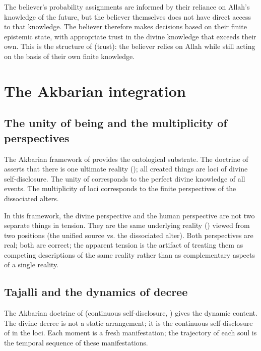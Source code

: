 The believer's probability assignments are informed by their
reliance on Allah's knowledge of the future, but the believer
themselves does not have direct access to that knowledge. The
believer therefore makes decisions based on their finite
epistemic state, with appropriate trust in the divine knowledge
that exceeds their own. This is the structure of 
(trust): the believer relies on Allah while still acting on the
basis of their own finite knowledge.

\section{The Akbarian integration}
\label{sec:qad-akbarian}

\subsection{The unity of being and the multiplicity of perspectives}

The Akbarian framework of  provides the
ontological substrate. The doctrine of 
asserts that there is one ultimate reality (); all
created things are loci of divine self-disclosure. The unity of
 corresponds to the perfect divine knowledge of all
events. The multiplicity of loci corresponds to the finite
perspectives of the dissociated alters.

In this framework, the divine perspective and the human
perspective are not two separate things in tension. They are the
same underlying reality () viewed from two positions
(the unified source vs. the dissociated alter). Both perspectives
are real; both are correct; the apparent tension is the artifact
of treating them as competing descriptions of the same reality
rather than as complementary aspects of a single reality.

\subsection{Tajalli and the dynamics of decree}

The Akbarian doctrine of  (continuous self-disclosure,
) gives the dynamic content. The
divine decree is not a static arrangement; it is the continuous
self-disclosure of  in the loci. Each moment is a
fresh manifestation; the trajectory of each soul is the temporal
sequence of these manifestations.

